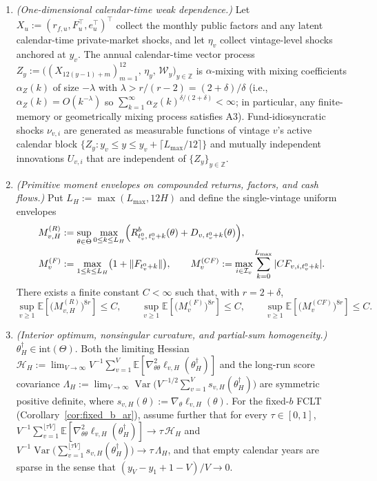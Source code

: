 \begin{assume}
\begin{enumerate}
  \item[\textbf{A3}] \emph{(One-dimensional calendar-time weak dependence.)} Let $X_u := (r_{f,u}, F_u^\top, e_u^\top)^\top$ collect the monthly public factors and any latent calendar-time private-market shocks, and let $\eta_v$ collect vintage-level shocks anchored at $y_v$. The annual calendar-time vector process $Z_y := \bigl((X_{12(y-1)+m})_{m=1}^{12},\, \eta_y,\, \mathcal{W}_y\bigr)_{y \in \mathbb{Z}}$ is $\alpha$-mixing with mixing coefficients $\alpha_Z(k)$ of size $-\lambda$ with $\lambda > r/(r-2) = (2+\delta)/\delta$ (i.e., $\alpha_Z(k) = O(k^{-\lambda})$ so $\sum_{k=1}^\infty \alpha_Z(k)^{\delta/(2+\delta)} < \infty$; in particular, any finite-memory or geometrically mixing process satisfies A3). Fund-idiosyncratic shocks $\nu_{v,i}$ are generated as measurable functions of vintage $v$'s active calendar block $\{Z_y : y_v \le y \le y_v + \lceil L_{\max}/12 \rceil\}$ and mutually independent innovations $U_{v,i}$ that are independent of $\{Z_y\}_{y \in \mathbb{Z}}$.

  \item[\textbf{A4}] \emph{(Primitive moment envelopes on compounded returns, factors, and cash flows.)} Put $L_H := \max(L_{\max}, 12H)$ and define the single-vintage uniform envelopes
  \begin{align*}
  M_{v,H}^{(R)} &:= \sup_{\theta \in \Theta} \max_{0 \le k \le L_H} \Bigl(R^b_{t_v^0,\, t_v^0+k}(\theta) + D_{v,\,t_v^0+k}(\theta)\Bigr), \\
  M_v^{(F)} &:= \max_{1 \le k \le L_H}\bigl(1 + \|F_{t_v^0+k}\|\bigr),
  \qquad
  M_v^{(CF)} := \max_{i \in \mathcal{I}_v} \sum_{k=0}^{L_{\max}} |CF_{v,i,t_v^0+k}|.
  \end{align*}
  There exists a finite constant $C < \infty$ such that, with $r = 2 + \delta$,
  \[
  \sup_{v \ge 1} \mathbb{E}\!\left[\bigl(M_{v,H}^{(R)}\bigr)^{8r}\right] \le C,
  \qquad
  \sup_{v \ge 1} \mathbb{E}\!\left[\bigl(M_v^{(F)}\bigr)^{8r}\right] \le C,
  \qquad
  \sup_{v \ge 1} \mathbb{E}\!\left[\bigl(M_v^{(CF)}\bigr)^{8r}\right] \le C.
  \]

  \item[\textbf{A5}] \emph{(Interior optimum, nonsingular curvature, and partial-sum homogeneity.)} $\theta_H^\dagger \in \mathrm{int}(\Theta)$. Both the limiting Hessian $\mathcal{H}_H := \lim_{V\to\infty} V^{-1}\sum_{v=1}^V \mathbb{E}[\nabla_{\theta\theta}^2 \ell_{v,H}(\theta_H^\dagger)]$ and the long-run score covariance $\Lambda_H := \lim_{V\to\infty}\operatorname{Var}\bigl(V^{-1/2}\sum_{v=1}^V s_{v,H}(\theta_H^\dagger)\bigr)$ are symmetric positive definite, where $s_{v,H}(\theta) := \nabla_\theta \ell_{v,H}(\theta)$. For the fixed-$b$ FCLT (Corollary~\ref{cor:fixed_b_ar}), assume further that for every $\tau \in [0,1]$, $V^{-1}\sum_{v=1}^{\lfloor \tau V \rfloor} \mathbb{E}[\nabla_{\theta\theta}^2 \ell_{v,H}(\theta_H^\dagger)] \to \tau\,\mathcal{H}_H$ and $V^{-1}\operatorname{Var}\bigl(\sum_{v=1}^{\lfloor \tau V \rfloor} s_{v,H}(\theta_H^\dagger)\bigr) \to \tau\,\Lambda_H$, and that empty calendar years are sparse in the sense that $(y_V - y_1 + 1 - V)/V \to 0$.
\end{enumerate}
\end{assume}

